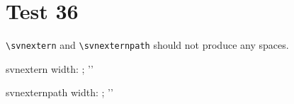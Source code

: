 \documentclass[12pt]{report}
\begin{document}
\chapter{Test 36}
\verb+\svnextern+ and \verb+\svnexternpath+ should not produce any spaces.

\newlength{\mywidth}
\newsavebox{\mybox}
\savebox{\mybox}{\svnextern{}}
\settowidth{\mywidth}{\usebox{\mybox}}
\noindent
svnextern width: \the\mywidth; '\usebox{\mybox}'\\

\savebox{\mybox}{\svnextern{}}
\settowidth{\mywidth}{\usebox{\mybox}}
\noindent
svnexternpath width: \the\mywidth; '\usebox{\mybox}'\\
\end{document}
